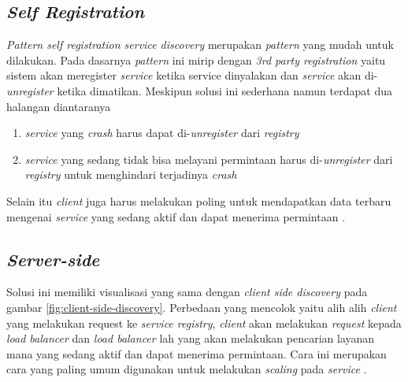 \subsection{\textit{Self Registration}}
\textit{Pattern self registration service discovery} merupakan \textit{pattern} yang mudah untuk dilakukan. Pada dasarnya \textit{pattern} ini mirip dengan \textit{3rd party registration} yaitu sistem akan meregister \textit{service} ketika service dinyalakan dan \textit{service} akan di-\textit{unregister} ketika dimatikan. Meskipun solusi ini sederhana namun terdapat dua halangan diantaranya

\begin{enumerate}
  \item \textit{service} yang \textit{crash} harus dapat di-\textit{unregister} dari \textit{registry}
  \item \textit{service} yang sedang tidak bisa melayani permintaan harus di-\textit{unregister} dari \textit{registry} untuk menghindari terjadinya \textit{crash}
\end{enumerate}

Selain itu \textit{client} juga harus melakukan poling untuk mendapatkan data terbaru mengenai \textit{service} yang sedang aktif dan dapat menerima permintaan \parencite{selfregistration}.

\subsection{\textit{Server-side}}
Solusi ini memiliki visualisasi yang sama dengan \textit{client side discovery} pada gambar \ref{fig:client-side-discovery}. Perbedaan yang mencolok yaitu alih alih \textit{client} yang melakukan request ke \textit{service registry}, \textit{client} akan melakukan \textit{request} kepada \textit{load balancer} dan \textit{load balancer} lah yang akan melakukan pencarian layanan mana yang sedang aktif dan dapat menerima permintaan. Cara ini merupakan cara yang paling umum digunakan untuk melakukan \textit{scaling} pada \textit{service} \parencite{servicesidediscovery}.
